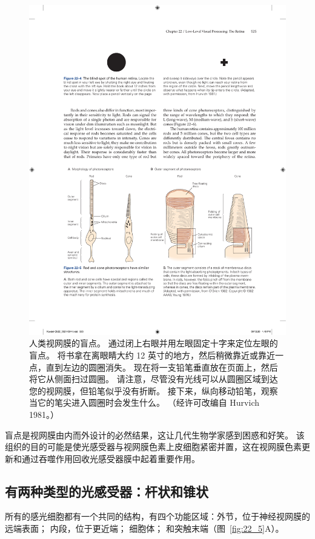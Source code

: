 \begin{figure}[htbp]
	\centering
	\includegraphics[width=0.7\linewidth]{chap22/fig_22_4}
	\caption{人类视网膜的盲点。
		通过闭上右眼并用左眼固定十字来定位左眼的盲点。
		将书拿在离眼睛大约 12 英寸的地方，然后稍微靠近或靠近一点，直到左边的圆圈消失。 
		现在将一支铅笔垂直放在页面上，然后将它从侧面扫过圆圈。 
		请注意，尽管没有光线可以从圆圈区域到达您的视网膜，但铅笔似乎没有折断。 
		接下来，纵向移动铅笔，观察当它的笔尖进入圆圈时会发生什么。 （经许可改编自 Hurvich 1981。）}
	\label{fig:22_4}
\end{figure}


盲点是视网膜由内而外设计的必然结果，这让几代生物学家感到困惑和好笑。
该组织的目的可能是使光感受器与视网膜色素上皮细胞紧密并置，这在视网膜色素更新和通过吞噬作用回收光感受器膜中起着重要作用。


\subsection{有两种类型的光感受器：杆状和锥状}

所有的感光细胞都有一个共同的结构，有四个功能区域：外节，位于神经视网膜的远端表面；
内段，位于更近端； 细胞体；
和突触末端（图~\ref{fig:22_5}A）。


